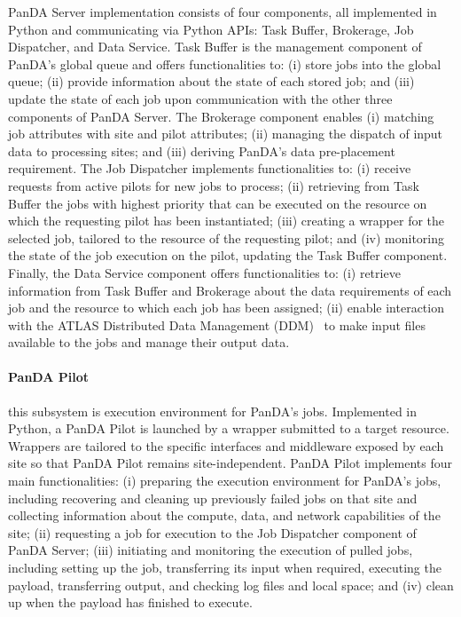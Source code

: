 PanDA Server implementation consists of four components, all implemented in
Python and communicating via Python APIs: Task Buffer, Brokerage, Job
Dispatcher, and Data Service. Task Buffer is the management component of PanDA's
global queue and offers functionalities to: (i) store jobs into the global
queue; (ii) provide information about the state of each stored job; and (iii)
update the state of each job upon communication with the other three components
of PanDA Server. The Brokerage component enables (i) matching job attributes
with site and pilot attributes; (ii) managing the dispatch of input data to
processing sites; and (iii) deriving PanDA's data pre-placement requirement.
The Job Dispatcher implements functionalities to: (i) receive requests from
active pilots for new jobs to process; (ii) retrieving from Task Buffer the jobs
with highest priority that can be executed on the resource on which the
requesting pilot has been instantiated; (iii) creating a wrapper for the
selected job, tailored to the resource of the requesting pilot; and (iv)
monitoring the state of the job execution on the pilot, updating the Task Buffer
component. Finally, the Data Service component offers functionalities to: (i)
retrieve information from Task Buffer and Brokerage about the data requirements
of each job and the resource to which each job has been assigned; (ii) enable
interaction with the ATLAS Distributed Data Management (DDM)~\cite{atlas_ddm} to
make input files available to the jobs and manage their output data.

\paragraph{\textbf{PanDA Pilot}} this subsystem is execution environment for
PanDA's jobs. Implemented in Python, a PanDA Pilot is launched by a wrapper
submitted to a target resource. Wrappers are tailored to the specific interfaces
and middleware exposed by each site so that PanDA Pilot remains
site-independent. PanDA Pilot implements four main functionalities: (i)
preparing the execution environment for PanDA's jobs, including recovering and
cleaning up previously failed jobs on that site and collecting information about
the compute, data, and network capabilities of the site; (ii) requesting a job
for execution to the Job Dispatcher component of PanDA Server; (iii) initiating
and monitoring the execution of pulled jobs, including setting up the job,
transferring its input when required, executing the payload, transferring
output, and checking log files and local space; and (iv) clean up when the
payload has finished to execute.

